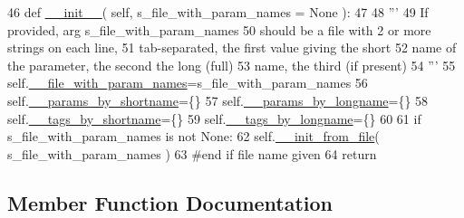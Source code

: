 \begin{DoxyCode}
46     \textcolor{keyword}{def }\hyperlink{classnegui_1_1pgparamset_1_1PGParamSet_a598ea6a166f56fe5be01f86d4d8c91ba}{\_\_init\_\_}( self, s\_file\_with\_param\_names = None ):
47 
48         \textcolor{stringliteral}{'''}
49 \textcolor{stringliteral}{        If provided, arg s\_file\_with\_param\_names}
50 \textcolor{stringliteral}{        should be a file with 2 or more strings on each line,}
51 \textcolor{stringliteral}{        tab-separated, the first value giving the short}
52 \textcolor{stringliteral}{        name of the parameter, the second the long (full)}
53 \textcolor{stringliteral}{        name, the third (if present)}
54 \textcolor{stringliteral}{        '''}
55         self.\hyperlink{classnegui_1_1pgparamset_1_1PGParamSet_aafa67026a09aa523151728cba95e0d6d}{\_\_file\_with\_param\_names}=s\_file\_with\_param\_names
56         self.\hyperlink{classnegui_1_1pgparamset_1_1PGParamSet_a20f20a276c98065fb0e5e00062bd4583}{\_\_params\_by\_shortname}=\{\}
57         self.\hyperlink{classnegui_1_1pgparamset_1_1PGParamSet_a7241c6d2ba9c73f4e09b578bca77a422}{\_\_params\_by\_longname}=\{\}
58         self.\hyperlink{classnegui_1_1pgparamset_1_1PGParamSet_aa13eaff9049bc16fa4090c8b85915f3c}{\_\_tags\_by\_shortname}=\{\}
59         self.\hyperlink{classnegui_1_1pgparamset_1_1PGParamSet_a90505c426805afbad28cd2d3b1df6a6e}{\_\_tags\_by\_longname}=\{\}
60 
61         \textcolor{keywordflow}{if} s\_file\_with\_param\_names \textcolor{keywordflow}{is} \textcolor{keywordflow}{not} \textcolor{keywordtype}{None}:
62             self.\hyperlink{classnegui_1_1pgparamset_1_1PGParamSet_abc19f133ab3ecc86ec8099549b0b45bb}{\_\_init\_from\_file}( s\_file\_with\_param\_names )
63         \textcolor{comment}{#end if file name given}
64         \textcolor{keywordflow}{return}
\end{DoxyCode}


\subsection{Member Function Documentation}
